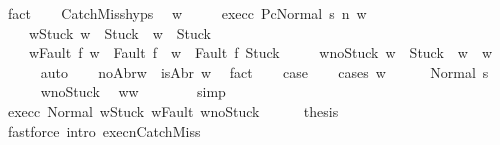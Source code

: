 \begin{isabellebody}
\ fact\isanewline
\ \ \isamarkupfalse%
\ CatchMiss{\isachardot}hyps\ \isamarkupfalse%
\ w{\isacharprime}\ \isanewline
\ \ \ \ exec{\isacharunderscore}c{}{\isacharprime}{\isacharcolon}\ {\isachardoublequoteopen}{\isasymGamma}{\isacharbar}\isactrlbsub P\isactrlesub {\isasymturnstile}{\isasymlangle}c{}{\isacharcomma}Normal\ s{\isasymrangle}\ {\isacharequal}n{\isasymRightarrow}\ w{\isacharprime}{\isachardoublequoteclose}\ \isanewline
\ \ \ \ w{\isacharunderscore}Stuck{\isacharcolon}\ {\isachardoublequoteopen}w\ {\isacharequal}\ Stuck\ {\isasymlongrightarrow}\ w{\isacharprime}\ {\isacharequal}\ Stuck{\isachardoublequoteclose}\ \isanewline
\ \ \ \ w{\isacharunderscore}Fault{\isacharcolon}\ {\isachardoublequoteopen}{\isasymforall}f{\isachardot}\ w\ {\isacharequal}\ Fault\ f\ {\isasymlongrightarrow}\ w{\isacharprime}\ {\isasymin}\ {\isacharbraceleft}Fault\ f{\isacharcomma}\ Stuck{\isacharbraceright}{\isachardoublequoteclose}\ \isanewline
\ \ \ \ w{\isacharprime}{\isacharunderscore}noStuck{\isacharcolon}\ {\isachardoublequoteopen}w{\isacharprime}\ {\isasymnoteq}\ Stuck\ {\isasymlongrightarrow}\ w{\isacharprime}\ {\isacharequal}\ w{\isachardoublequoteclose}\isanewline
\ \ \ \ \isamarkupfalse%
\ auto\isanewline
\ \ \isamarkupfalse%
\ noAbr{\isacharunderscore}w{\isacharcolon}\ {\isachardoublequoteopen}{\isasymnot}\ isAbr\ w{\isachardoublequoteclose}\ \isamarkupfalse%
\ fact\isanewline
\ \ \isamarkupfalse%
\ {\isacharquery}case\isanewline
\ \ \isamarkupfalse%
\ {\isacharparenleft}cases\ w{\isacharprime}{\isacharparenright}\isanewline
\ \ \ \ \isamarkupfalse%
\ {\isacharparenleft}Normal\ s{\isacharprime}{\isacharparenright}\isanewline
\ \ \ \ \isamarkupfalse%
\ w{\isacharprime}{\isacharunderscore}noStuck\ \isamarkupfalse%
\ {\isachardoublequoteopen}w{\isacharprime}{\isacharequal}w{\isachardoublequoteclose}\isanewline
\ \ \ \ \ \ \isamarkupfalse%
\ simp\isanewline
\ \ \ \ \isamarkupfalse%
\ exec{\isacharunderscore}c{}{\isacharprime}\ Normal\ w{\isacharunderscore}Stuck\ w{\isacharunderscore}Fault\ w{\isacharprime}{\isacharunderscore}noStuck\isanewline
\ \ \ \ \isamarkupfalse%
\ {\isacharquery}thesis\isanewline
\ \ \ \ \ \ \isamarkupfalse%
\ {\isacharparenleft}fastforce\ intro{\isacharcolon}\ execn{\isachardot}CatchMiss{\isacharparenright}\isanewline

\end{isabellebody}
